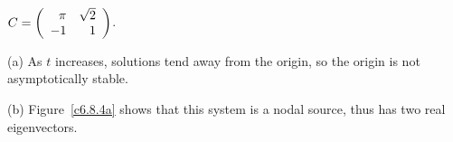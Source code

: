 \documentclass{ximera}
\begin{document}
\begin{exercise} \label{c6.8.4a}
$C=\left(\begin{array}{rr} \pi & \sqrt{2}\\ -1 &1\end{array}\right)$.

\begin{solution}

(a) As $t$ increases, solutions tend away from the origin, so the origin
is not asymptotically stable.

(b) Figure~\ref{c6.8.4a} shows that this system is a nodal source,
thus has two real eigenvectors.

\end{solution}
\end{exercise}
\end{document}
